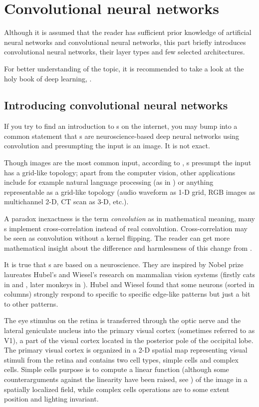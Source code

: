\chapter{Convolutional neural networks}
\label{cnn}

\setcounter{secnumdepth}{1}

Although it is assumed that the reader has sufficient prior knowledge of artificial neural networks and convolutional neural networks, this part briefly introduces convolutional neural networks, their layer types and few selected architectures. 

For better understanding of the topic, it is recommended to take a look at the holy book of deep learning, \cite{dl}.

\section{Introducing convolutional neural networks}
\label{understanding-cnn}

If you try to find an introduction to s on the internet, you may bump into a common statement that s are neuroscience-based deep neural networks using convolution and presumpting the input is an image. It is not exact. 

Though images are the most common input, according to \cite{dl}, s presumpt the input has a grid-like topology; apart from the computer vision, other applications include  for example natural language processing (as in \cite{cnn-nlp}) or anything representable as a grid-like topology (audio waveform as 1-D grid, RGB images as multichannel 2-D, CT scan as 3-D, etc.). 

A paradox inexactness is the term \textit{convolution} as in mathematical meaning, many s implement cross-correlation instead of real convolution. Cross-correlation may be seen as convolution without a kernel flipping. The reader can get more mathematical insight about the difference and harmlessness of this change from \cite{dl}. 

It is true that s are based on a neuroscience. They are inspired by Nobel prize laureates Hubel's and Wiesel's research on mammalian vision systems (firstly cats in \cite{hubel-cats1} and \cite{hubel-cats2}, later monkeys in \cite{hubel-monkeys}). Hubel and Wiesel found that some neurons (sorted in columns) strongly respond to specific to specific edge-like patterns but just a bit to other patterns. 

The eye stimulus on the retina is transferred through the optic nerve and the lateral geniculate nucleus into the primary visual cortex (sometimes referred to as V1), a part of the visual cortex located in the posterior pole of the occipital lobe. The primary visual cortex is organized in a 2-D spatial map representing visual stimuli from the retina and contains two cell types, simple cells and complex cells. Simple cells purpose is to compute a linear function (although some counterarguments against the linearity have been raised, see \cite{simple-cells}) of the image in a spatially localized field, while complex cells operations are to some extent position and lighting invariant. 


